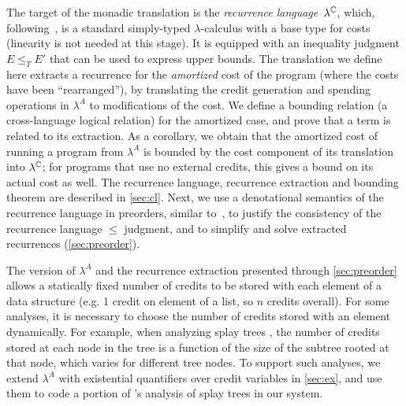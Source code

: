 The target of the monadic translation is the \emph{recurrence
language}~$\lambda^{\mathbb{C}}$, which,
following~\cite{danner-et-al:icfp15,hudson}, is a
standard simply-typed $\lambda$-calculus with a base type for costs
(linearity is not needed at this stage). It is equipped with an
inequality judgment $E \le_T E'$ that can be used to express upper
bounds.  The translation we define here extracts a recurrence for the
\emph{amortized} cost of the program (where the costs have been
``rearranged''), by translating the credit generation and spending
operations in $\lambda^A$ to modifications of the cost.  We define a
bounding relation (a cross-language logical relation) for the amortized
case, and prove that a term is related to its extraction.  As a
corollary, we obtain that the amortized cost of running a program from
$\lambda^A$ is bounded by the cost component of its translation into
$\lambda^{\mathbb{C}}$; for programs that use no external credits, this gives
a bound on its actual cost as well.  The recurrence language, recurrence
extraction and bounding theorem are described in \autoref{sec:cl}.
Next, we use a denotational semantics of the recurrence language in
preorders, similar to~\cite{danner-et-al:icfp15}, to justify the
consistency of the recurrence language $\le$ judgment, and to simplify
and solve extracted recurrences (\autoref{sec:preorder}).

The version of $\lambda^A$ and the recurrence extraction presented
through \autoref{sec:preorder} allows a statically fixed number of
credits to be stored with each element of a data structure (e.g. 1
credit on element of a list, so $n$ credits overall).  For some
analyses, it is necessary to choose the number of credits stored with an
element dynamically.  For example, when analyzing
splay trees \cite{sleator-tarjan-85}, the number of
credits stored at each node in the tree is a function of the size of the
subtree rooted at that node, which varies for different tree nodes.  To
support such analyses, we extend $\lambda^A$
with existential quantifiers over credit variables
in \autoref{sec:ex}, and use them to code
a portion of \citet{okasaki:purely-functional-data-structures}'s
analysis of splay trees in our system.  

